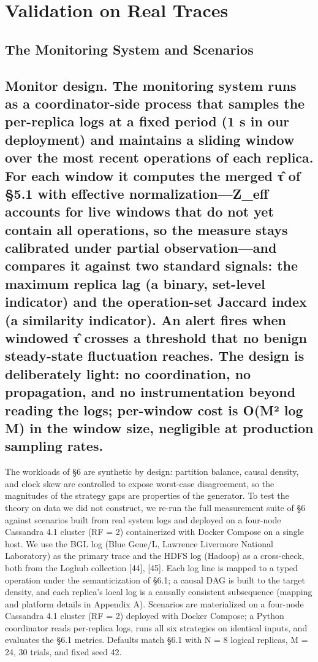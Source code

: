 \documentclass[10pt,twocolumn]{article}
\begin{document}
\section{Validation on Real Traces}
\subsection{The Monitoring System and Scenarios}
\subsection{Monitor design. The monitoring system runs as a coordinator-side process that samples the per-replica logs at a fixed period (1 s in our deployment) and maintains a sliding window over the most recent operations of each replica. For each window it computes the merged τ̂ of §5.1 with effective normalization—Z\_eff accounts for live windows that do not yet contain all operations, so the measure stays calibrated under partial observation—and compares it against two standard signals: the maximum replica lag (a binary, set-level indicator) and the operation-set Jaccard index (a similarity indicator). An alert fires when windowed τ̂ crosses a threshold that no benign steady-state fluctuation reaches. The design is deliberately light: no coordination, no propagation, and no instrumentation beyond reading the logs; per-window cost is O(M² log M) in the window size, negligible at production sampling rates.}
The workloads of §6 are synthetic by design: partition balance, causal density, and clock skew are controlled to expose worst-case disagreement, so the magnitudes of the strategy gaps are properties of the generator. To test the theory on data we did not construct, we re-run the full measurement suite of §6 against scenarios built from real system logs and deployed on a four-node Cassandra 4.1 cluster (RF = 2) containerized with Docker Compose on a single host. We use the BGL log (Blue Gene/L, Lawrence Livermore National Laboratory) as the primary trace and the HDFS log (Hadoop) as a cross-check, both from the Loghub collection [44], [45]. Each log line is mapped to a typed operation under the semanticization of §6.1; a causal DAG is built to the target density, and each replica's local log is a causally consistent subsequence (mapping and platform details in Appendix A). Scenarios are materialized on a four-node Cassandra 4.1 cluster (RF = 2) deployed with Docker Compose; a Python coordinator reads per-replica logs, runs all six strategies on identical inputs, and evaluates the §6.1 metrics. Defaults match §6.1 with N = 8 logical replicas, M = 24, 30 trials, and fixed seed 42.
\end{document}
